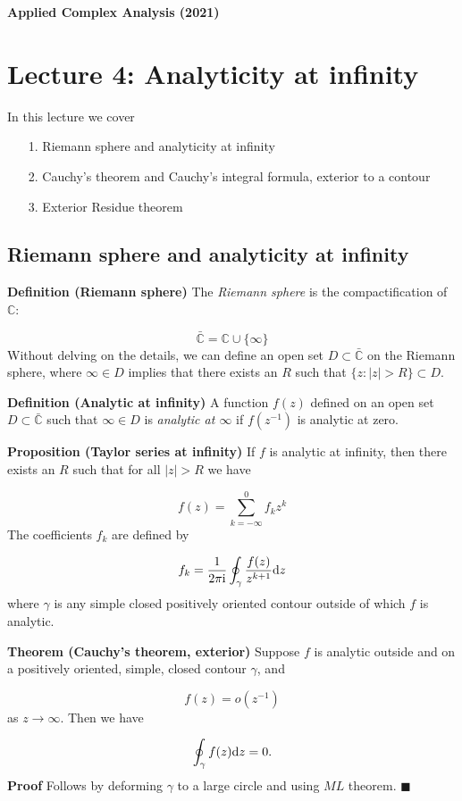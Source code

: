 \documentclass[12pt,a4paper]{article}
\def\D{ {\rm d} }
\def\I{ {\rm i} }
\def\dz{\D z}
\begin{document}
\textbf{Applied Complex Analysis (2021)}

\section{Lecture 4: Analyticity at infinity}
In this lecture we cover

\begin{itemize}
\item[1. ] Riemann sphere and analyticity at infinity


\item[2. ] Cauchy's theorem and Cauchy's integral formula, exterior to a contour


\item[3. ] Exterior Residue theorem

\end{itemize}
\subsection{Riemann sphere and analyticity at infinity}
\textbf{Definition (Riemann sphere)} The \emph{Riemann sphere} is the compactification of ${\mathbb C}$:

\[
    \bar {\mathbb C} = {\mathbb C} \cup \{\infty\}
\]
Without delving on the details, we can define an open set $D \subset \bar{\mathbb C}$ on the Riemann sphere, where $\infty \in D$ implies that there exists an $R$ such that $\{ z : |z| > R\} \subset D$.

\textbf{Definition (Analytic at infinity)} A function $f(z)$ defined on an open set $D \subset \bar {\mathbb C}$ such that $\infty \in D$ is \emph{analytic at \ensuremath{\infty}} if $f(z^{-1})$ is analytic at zero.

\textbf{Proposition (Taylor series at infinity)} If $f$ is analytic at infinity, then there exists an $R$ such that for all $|z| > R$ we have

\[
f(z) = \sum_{k=-\infty}^0 f_k z^k
\]
The coefficients $f_k$ are defined by

\[
f_k = {1 \over 2 \pi \I} \oint_\gamma {f(z) \over z^{k+1}} \dz
\]
where $\gamma$ is any simple closed positively oriented contour outside of which $f$ is analytic.

\textbf{Theorem (Cauchy's theorem, exterior)} Suppose $f$ is analytic outside and on a positively oriented, simple, closed contour $\gamma$, and

\[
f(z) = o(z^{-1})
\]
as $z \rightarrow \infty$. Then we have

\[
\oint_\gamma f(z) \D z = 0.
\]
\textbf{Proof} Follows by deforming $\gamma$ to a large circle and using $ML$ theorem. \ensuremath{\blacksquare}
\end{document}
